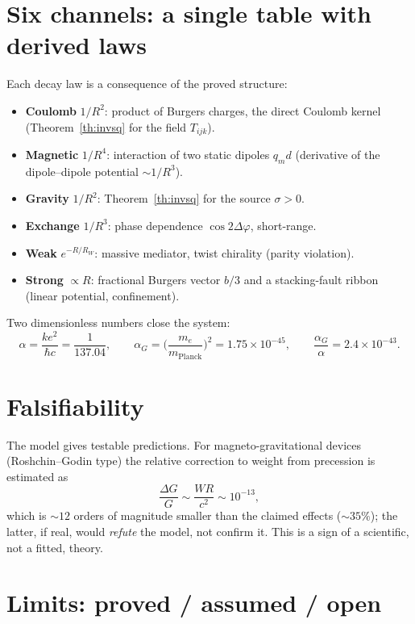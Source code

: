 \documentclass[12pt,a4paper]{article}
\begin{document}
\section{Six channels: a single table with derived laws}
\label{sec:channels}
Each decay law is a consequence of the proved structure:
\begin{itemize}[nosep]
\item \textbf{Coulomb} $1/R^2$: product of Burgers charges, the direct Coulomb
kernel (Theorem~\ref{th:invsq} for the field $T_{ijk}$).
\item \textbf{Magnetic} $1/R^4$: interaction of two static dipoles $q_m d$
(derivative of the dipole--dipole potential $\sim1/R^3$).
\item \textbf{Gravity} $1/R^2$: Theorem~\ref{th:invsq} for the source $\sigma>0$.
\item \textbf{Exchange} $1/R^3$: phase dependence $\cos2\Delta\varphi$, short-range.
\item \textbf{Weak} $e^{-R/R_W}$: massive mediator, twist chirality (parity violation).
\item \textbf{Strong} $\propto R$: fractional Burgers vector $b/3$ and a stacking-fault
ribbon (linear potential, confinement).
\end{itemize}
Two dimensionless numbers close the system:
\begin{equation}
\alpha=\frac{ke^2}{\hbar c}=\frac{1}{137.04},\qquad
\alpha_G=\Big(\frac{m_e}{m_{\text{Planck}}}\Big)^2=1.75\times10^{-45},\qquad
\frac{\alpha_G}{\alpha}=2.4\times10^{-43}.
\end{equation}

\section{Falsifiability}
The model gives testable predictions. For magneto-gravitational devices
(Roshchin--Godin type) the relative correction to weight from precession is
estimated as
\begin{equation}
\frac{\Delta G}{G}\sim\frac{W R}{c^2}\sim 10^{-13},
\end{equation}
which is $\sim\!12$ orders of magnitude smaller than the claimed effects
($\sim\!35\%$); the latter, if real, would \emph{refute} the model, not confirm
it. This is a sign of a scientific, not a fitted, theory.

\section{Limits: proved / assumed / open}
\end{document}
